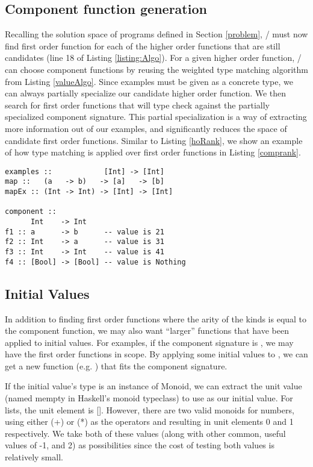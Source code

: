 \subsection{Component function generation}\label{makeFxns}

Recalling the solution space of programs defined in Section \ref{problem}, \ourTool/ must now find first order function for each of the higher order functions that are still candidates (line 18 of Listing \ref{listing:Algo}).
For a given higher order function, \ourTool/ can choose component functions by reusing the weighted type matching algorithm from Listing \ref{valueAlgo}.
Since examples must be given as a concrete type, we can always partially specialize our candidate higher order function. 
We then search for first order functions that will type check against the partially specialized component signature.
This partial specialization is a way of extracting more information out of our examples, and significantly reduces the space of candidate first order functions.
Similar to Listing \ref{hoRank}, we show an example of how type matching is applied over first order functions in Listing \ref{comprank}.

\begin{lstlisting}[caption=Ranking component function,label=comprank]
examples ::            [Int] -> [Int]
map ::   (a   -> b)   -> [a]   -> [b]
mapEx :: (Int -> Int) -> [Int] -> [Int]

component ::
      Int    -> Int
f1 :: a      -> b      -- value is 21
f2 :: Int    -> a      -- value is 31
f3 :: Int    -> Int    -- value is 41
f4 :: [Bool] -> [Bool] -- value is Nothing
\end{lstlisting}

\subsection{Initial Values}

In addition to finding first order functions where the arity of the kinds is equal to the component function, we may also want ``larger'' functions that have been applied to initial values.
For examples, if the component signature is , we may have the first order functions  in scope.
By applying some initial values to \codeinline{(+)}, we can get a new function (e.g. ) that fits the component signature.

If the initial value's type is an instance of Monoid, we can extract the unit value (named mempty in Haskell's monoid typeclass\cite{monoid}) to use as our initial value. For lists, the unit element is []. However, there are two valid monoids for numbers, using either (+) or (*) as the operators and resulting in unit elements 0 and 1 respectively. We take both of these values (along with other common, useful values of -1, and 2) as possibilities since the cost of testing both values is relatively small.

